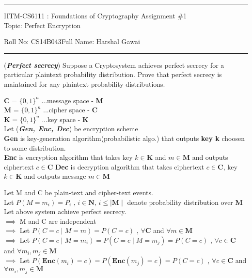 \documentclass[11pt]{exam}
\begin{document}

\hrule
\vspace{3mm}
\noindent
{\sf IITM-CS6111 : Foundations of Cryptography  \hfill Assignment \#1 }
\vspace{3mm} \\
\noindent
{\sf Topic: Perfect Encryption \hfill}

\vspace{3mm}
\noindent
{\sf Roll No: CS14B043\hfill Full Name: Harshal Gawai} 
\vspace{3mm}
\hrule

\begin{questions}
\question[10] ({\bf \textit{Perfect secrecy}}) 
Suppose a Cryptosystem achieves perfect secrecy for a particular plaintext probability distribution. Prove that perfect secrecy is maintained for any plaintext probability distributions.
\begin{solution}

    \textbf{C} = $\{0,1\}^n$        ...message space - \textbf{M} \\
    \textbf{M} = $\{0,1\}^n$        ...cipher space - \textbf{C} \\
    \textbf{K} = $\{0,1\}^n$        ...key space - \textbf{K} \\

    Let ({\bf \textit{Gen, Enc, Dec}}) be encryption scheme \\
    \textbf{Gen} is key-generation algorithm(probabilistic algo.) that outputs \textbf{key k} choosen to some distribution. \\
    \textbf{Enc} is encryption algorithm that takes key $k \in \textbf{K}$ and $m \in  \textbf{M}$ and outputs ciphertext $c \in \textbf{C}$
    \textbf{Dec} is decryption algorithm that takes ciphertext $c \in \textbf{C}$, key $k \in \textbf{K}$ and outputs message $m \in  \textbf{M}$
    
    Let M and C be plain-text and cipher-text events.\\
    Let $P(M=m_i) = P_i$  , $i \in \textbf{N}$, $i \leq \mid\textbf{M}\mid$ denote probability distribution over \textbf{M}\\
    Let above system achieve perfect secrecy.\\
    $\implies$ M and C are independent\\
    $\implies$ Let $P(C=c\mid M=m) = P(C=c)$ , $\forall \textbf{C}$ and $\forall m \in \textbf{M}$\\
    $\implies$ Let $P(C=c\mid M=m_i) = P(C=c\mid M=m_j) = P(C=c)$ , $\forall c \in \textbf{C}$ and $\forall m_i,m_j \in \textbf{M}$\\
     $\implies$ Let $P(\textbf{Enc}(m_i)=c) = P(\textbf{Enc}(m_j)=c) = P(C=c)$ , $\forall c \in \textbf{C}$ and $\forall m_i,m_j \in \textbf{M}$\\
     

\end{solution}
\end{questions}
\end{document}
